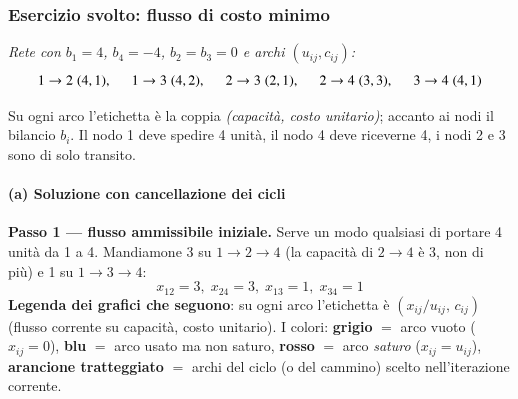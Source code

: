\documentclass[12pt]{extarticle} %
\begin{document}
\subsubsection{Esercizio svolto: flusso di costo minimo}
\textit{Rete con $b_1 = 4$, $b_4 = -4$, $b_2=b_3=0$ e archi $(u_{ij}, c_{ij})$:}
\[
1\to2\; (4,1), \hspace{0.5cm} 1\to3\; (4,2), \hspace{0.5cm} 2\to3\; (2,1), \hspace{0.5cm} 2\to4\; (3,3), \hspace{0.5cm} 3\to4\; (4,1)
\]
\begin{center}
\end{center}
\noindent Su ogni arco l'etichetta è la coppia \emph{(capacità, costo unitario)}; accanto ai nodi il bilancio $b_i$. Il nodo 1 deve spedire 4 unità, il nodo 4 deve riceverne 4, i nodi 2 e 3 sono di solo transito.

\paragraph{(a) Soluzione con cancellazione dei cicli}
\textbf{Passo 1 --- flusso ammissibile iniziale.} Serve un modo qualsiasi di portare 4 unità da 1 a 4. Mandiamone 3 su $1\to2\to4$ (la capacità di $2\to4$ è 3, non di più) e 1 su $1\to3\to4$:
\[
x_{12}=3,\; x_{24}=3,\; x_{13}=1,\; x_{34}=1
\]
\noindent\textbf{Legenda dei grafici che seguono}: su ogni arco l'etichetta è $(x_{ij}/u_{ij},\,c_{ij})$ (flusso corrente su capacità, costo unitario). I colori: \textcolor{gray!60!black}{\textbf{grigio}} $=$ arco vuoto ($x_{ij}=0$), \textcolor{blue!70!black}{\textbf{blu}} $=$ arco usato ma non saturo, \textcolor{red!75!black}{\textbf{rosso}} $=$ arco \emph{saturo} ($x_{ij}=u_{ij}$), \textcolor{orange!90!black}{\textbf{arancione tratteggiato}} $=$ archi del ciclo (o del cammino) scelto nell'iterazione corrente.
\end{document}

